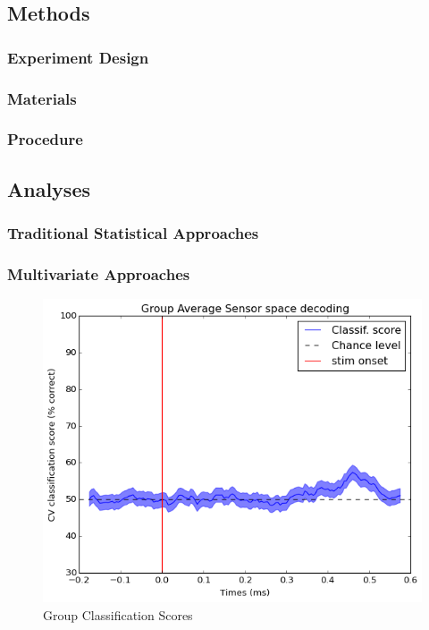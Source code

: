 \documentclass[english]{article}
\begin{document}
\subsection{Methods}
\subsubsection{Experiment Design}
\subsubsection{Materials}
\subsubsection{Procedure}
\subsection{Analyses}
\subsubsection{Traditional Statistical Approaches}
\subsubsection{Multivariate Approaches}
\begin{figure}[H]
\begin{centering}
\includegraphics[scale=0.33]{oldt-clf-priming}
\par\end{centering}
\caption{\label{fig:oldt} Group Classification Scores}
\end{figure}
\end{document}
